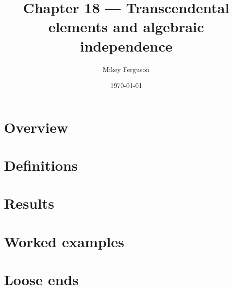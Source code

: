 \documentclass[11pt]{article}
\title{Chapter 18 --- Transcendental elements and algebraic independence}
\author{Mikey Ferguson}
\date{\today}
\begin{document}
\maketitle
\tableofcontents
\bigskip

\section{Overview}

\section{Definitions}

\section{Results}

\section{Worked examples}

\section{Loose ends}
\end{document}
